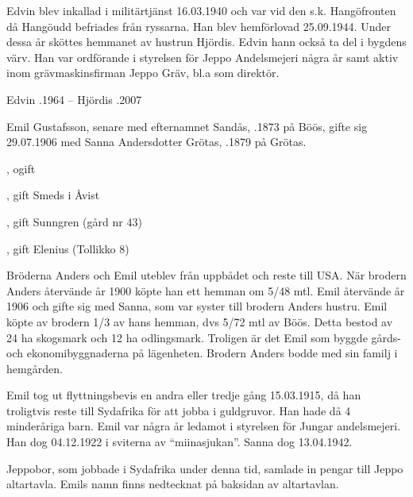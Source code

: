 Edvin blev inkallad i militärtjänst 16.03.1940 och var vid den s.k. Hangöfronten då Hangöudd befriades från ryssarna. Han blev hemförlovad 25.09.1944. Under dessa år sköttes hemmanet av hustrun Hjördis. Edvin hann också ta del i bygdens värv. Han var ordförande i styrelsen för Jeppo Andelsmejeri några år samt aktiv inom grävmaskinsfirman Jeppo Gräv, bl.a som direktör.

Edvin .1964  --  Hjördis .2007


Emil Gustafsson, senare med efternamnet Sandås, .1873 på Böös, gifte sig 29.07.1906 med Sanna Andersdotter Grötas, .1879 på Grötas.
\begin{jhchildren}
  \item {}, ogift
  \item {}, gift Smeds i Åvist
  \item {}
  \item {}, gift Sunngren (gård nr 43)
  \item {}, gift Elenius (Tollikko 8)
  \item {}
\end{jhchildren}


Bröderna Anders och Emil  uteblev från uppbådet och reste till USA. När brodern Anders återvände år 1900 köpte han ett hemman om 5/48 mtl. Emil återvände år 1906 och gifte sig med Sanna, som var syster till brodern Anders hustru. Emil köpte av brodern 1/3 av hans hemman, dvs 5/72 mtl av Böös. Detta bestod av 24 ha skogsmark och 12 ha odlingsmark. Troligen är det Emil som byggde gårds- och 				ekonomibyggnaderna på lägenheten. Brodern Anders bodde med sin familj i hemgården.

Emil tog ut flyttningsbevis en andra eller tredje gång 15.03.1915, då han troligtvis reste till Sydafrika för att jobba i guldgruvor. Han hade då 4 minderåriga barn. Emil var några år ledamot i styrelsen för Jungar andelsmejeri. Han dog 04.12.1922 i sviterna av ``miinasjukan''. Sanna dog 13.04.1942.

Jeppobor, som jobbade i Sydafrika under denna tid, samlade in pengar till Jeppo altartavla. Emils namn finns nedtecknat på baksidan av altartavlan.



